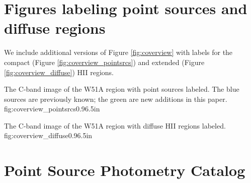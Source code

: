 

\appendix
\section{Figures labeling point sources and diffuse regions}
We include additional versions of Figure \ref{fig:coverview} with labels for
the compact (Figure \ref{fig:coverview_pointsrcs}) and extended (Figure
\ref{fig:coverview_diffuse}) HII regions.

{The C-band image of the W51A region with point sources labeled.  The blue
sources are previously known; the green are new additions in this paper.}
{fig:coverview_pointsrcs}{0.9}{6.5in}

{The C-band image of the W51A region with diffuse HII regions labeled.}
{fig:coverview_diffuse}{0.9}{6.5in}

%

\clearpage
\section{Point Source Photometry Catalog}
\label{sec:SEDs}






